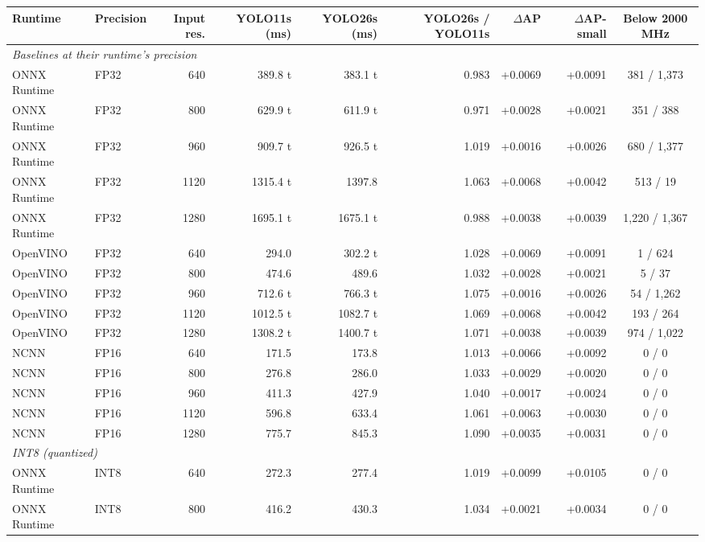 \begin{tabular}{llrrrrrrc}
\toprule
Runtime & Precision & Input res. & YOLO11s (ms) & YOLO26s (ms) & YOLO26s / YOLO11s & $\Delta$AP & $\Delta$AP-small & Below 2000 MHz \\
\midrule
\multicolumn{9}{l}{\textit{Baselines at their runtime's precision}} \\
ONNX Runtime & FP32 & 640 & 389.8 t & 383.1 t & 0.983 & +0.0069 & +0.0091 & 381 / 1{,}373 \\
ONNX Runtime & FP32 & 800 & 629.9 t & 611.9 t & 0.971 & +0.0028 & +0.0021 & 351 / 388 \\
ONNX Runtime & FP32 & 960 & 909.7 t & 926.5 t & 1.019 & +0.0016 & +0.0026 & 680 / 1{,}377 \\
ONNX Runtime & FP32 & 1120 & 1315.4 t & 1397.8 & 1.063 & +0.0068 & +0.0042 & 513 / 19 \\
ONNX Runtime & FP32 & 1280 & 1695.1 t & 1675.1 t & 0.988 & +0.0038 & +0.0039 & 1{,}220 / 1{,}367 \\
OpenVINO & FP32 & 640 & 294.0 & 302.2 t & 1.028 & +0.0069 & +0.0091 & 1 / 624 \\
OpenVINO & FP32 & 800 & 474.6 & 489.6 & 1.032 & +0.0028 & +0.0021 & 5 / 37 \\
OpenVINO & FP32 & 960 & 712.6 t & 766.3 t & 1.075 & +0.0016 & +0.0026 & 54 / 1{,}262 \\
OpenVINO & FP32 & 1120 & 1012.5 t & 1082.7 t & 1.069 & +0.0068 & +0.0042 & 193 / 264 \\
OpenVINO & FP32 & 1280 & 1308.2 t & 1400.7 t & 1.071 & +0.0038 & +0.0039 & 974 / 1{,}022 \\
NCNN & FP16 & 640 & 171.5 & 173.8 & 1.013 & +0.0066 & +0.0092 & 0 / 0 \\
NCNN & FP16 & 800 & 276.8 & 286.0 & 1.033 & +0.0029 & +0.0020 & 0 / 0 \\
NCNN & FP16 & 960 & 411.3 & 427.9 & 1.040 & +0.0017 & +0.0024 & 0 / 0 \\
NCNN & FP16 & 1120 & 596.8 & 633.4 & 1.061 & +0.0063 & +0.0030 & 0 / 0 \\
NCNN & FP16 & 1280 & 775.7 & 845.3 & 1.090 & +0.0035 & +0.0031 & 0 / 0 \\
\midrule
\multicolumn{9}{l}{\textit{INT8 (quantized)}} \\
ONNX Runtime & INT8 & 640 & 272.3 & 277.4 & 1.019 & +0.0099 & +0.0105 & 0 / 0 \\
ONNX Runtime & INT8 & 800 & 416.2 & 430.3 & 1.034 & +0.0021 & +0.0034 & 0 / 0 \\

\end{tabular}
